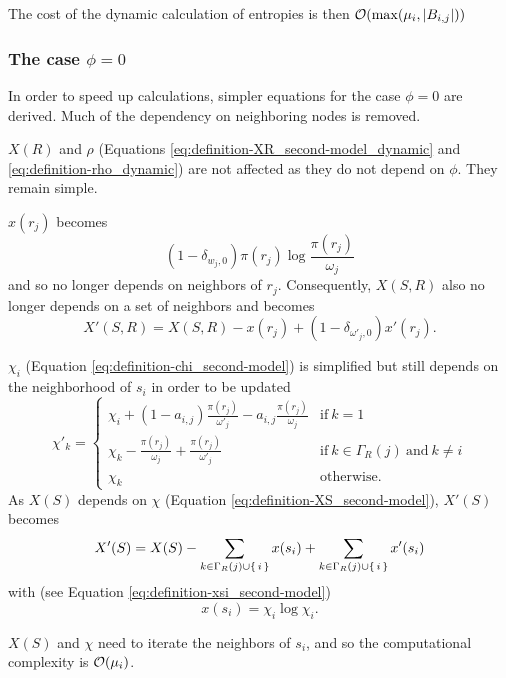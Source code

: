 The cost of the dynamic calculation of entropies is then $\mathcal{O}(\max(\mu_i,|B_{i,j}|))$

\subsubsection{The case $\phi=0$}

In order to speed up calculations, simpler equations for the case $\phi=0$ are derived. Much of the dependency on neighboring nodes is removed.

$X(R)$ and $\rho$ (Equations \eqref{eq:definition-XR_second-model_dynamic} and \eqref{eq:definition-rho_dynamic}) are not affected as they do not depend on $\phi$.
They remain simple.

$x(r_j)$ becomes
\begin{equation}
  \label{eq:definition-xrj_second-model_dynamic-phi0}
  (1-\delta_{w_j,0}) \pi(r_j)\log\frac{\pi(r_j)}{\omega_j}
\end{equation}
and so no longer depends on neighbors of $r_j$.
Consequently, $X(S,R)$ also no longer depends on a set of neighbors and becomes
\begin{equation}
  \label{eq:definition-XSR_second-model_dynamic-phi0}
  X'(S,R) = X(S,R) - x(r_j) + (1-\delta_{\omega'_j,0}) x'(r_j).
\end{equation}

$\chi_i$ (Equation \eqref{eq:definition-chi_second-model}) is simplified but still depends on the neighborhood of $s_i$ in order to be updated
\begin{equation}
  \label{eq:definition-chi_second-model_dynamic-phi0}
  \chi'_k = \begin{cases}
    \chi_i + (1-a_{i,j}) \frac{\pi(r_j)}{\omega'_j} - a_{i,j} \frac{\pi(r_j)}{\omega_j} & \text{if}~k=1 \\
    \chi_k - \frac{\pi(r_j)}{\omega_j} + \frac{\pi(r_j)}{\omega'_j} & \text{if}~k\in\Gamma_R(j)~\text{and}~k\neq i \\
    \chi_k & \text{otherwise}.
  \end{cases}
\end{equation}
As $X(S)$ depends on $\chi$ (Equation \eqref{eq:definition-XS_second-model}), $X'(S)$ becomes
\begin{equation}
  \label{eq:definition-XS_second-model_dynamic-phi0}
  X'(S) = X(S) - \sum_{k \in \Gamma_R(j) \cup \{\,i\,\}} x(s_i) + \sum_{k \in \Gamma_R(j) \cup \{\,i\,\}} x'(s_i)
\end{equation}
with (see Equation \eqref{eq:definition-xsi_second-model})
\begin{equation}
  \label{eq:definition-xsi_second-model_dynamic-phi0}
  x(s_i) = \chi_i \log \chi_i.
\end{equation}

$X(S)$ and $\chi$ need to iterate the neighbors of $s_i$, and so the computational complexity is $\mathcal{O}(\mu_i)$.

